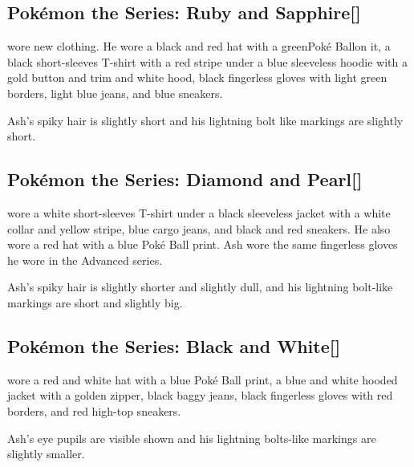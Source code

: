\documentclass[a4paper,12pt]{article}
\begin{document}
\subsection*{Pokémon the Series: Ruby and Sapphire[]}\n\nAsh wore new clothing. He wore a black and red hat with a greenPoké Ballon it, a black short-sleeves T-shirt with a red stripe under a blue sleeveless hoodie with a gold button and trim and white hood, black fingerless gloves with light green borders, light blue jeans, and blue sneakers.\\ \par \vspace{0.5cm}

Ash's spiky hair is slightly short and his lightning bolt like markings are slightly short.\\ \par \vspace{0.5cm}

\subsection*{Pokémon the Series: Diamond and Pearl[]}\n\nAsh wore a white short-sleeves T-shirt under a black sleeveless jacket with a white collar and yellow stripe, blue cargo jeans, and black and red sneakers. He also wore a red hat with a blue Poké Ball print. Ash wore the same fingerless gloves he wore in the Advanced series.\\ \par \vspace{0.5cm}

Ash's spiky hair is slightly shorter and slightly dull, and his lightning bolt-like markings are short and slightly big.\\ \par \vspace{0.5cm}

\subsection*{Pokémon the Series: Black and White[]}\n\nAsh wore a red and white hat with a blue Poké Ball print, a blue and white hooded jacket with a golden zipper, black baggy jeans, black fingerless gloves with red borders, and red high-top sneakers.\\ \par \vspace{0.5cm}

Ash's eye pupils are visible shown and his lightning bolts-like markings are slightly smaller.\\ \par \vspace{0.5cm}
\end{document}
